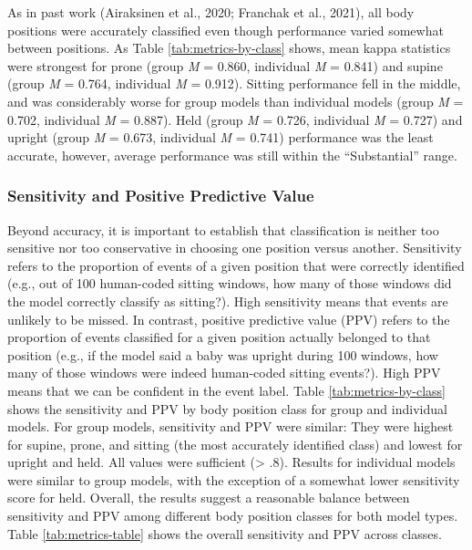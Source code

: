 \documentclass[
  man]{apa6}
\begin{document}
As in past work (Airaksinen et al., 2020; Franchak et al., 2021), all body positions were accurately classified even though performance varied somewhat between positions. As Table \ref{tab:metrics-by-class} shows, mean kappa statistics were strongest for prone (group \emph{M} = 0.860, individual \emph{M} = 0.841) and supine (group \emph{M} = 0.764, individual \emph{M} = 0.912). Sitting performance fell in the middle, and was considerably worse for group models than individual models (group \emph{M} = 0.702, individual \emph{M} = 0.887). Held (group \emph{M} = 0.726, individual \emph{M} = 0.727) and upright (group \emph{M} = 0.673, individual \emph{M} = 0.741) performance was the least accurate, however, average performance was still within the ``Substantial'' range.

\hypertarget{sensitivity-and-positive-predictive-value}{%
\subsubsection{Sensitivity and Positive Predictive Value}\label{sensitivity-and-positive-predictive-value}}

Beyond accuracy, it is important to establish that classification is neither too sensitive nor too conservative in choosing one position versus another. Sensitivity refers to the proportion of events of a given position that were correctly identified (e.g., out of 100 human-coded sitting windows, how many of those windows did the model correctly classify as sitting?). High sensitivity means that events are unlikely to be missed. In contrast, positive predictive value (PPV) refers to the proportion of events classified for a given position actually belonged to that position (e.g., if the model said a baby was upright during 100 windows, how many of those windows were indeed human-coded sitting events?). High PPV means that we can be confident in the event label. Table \ref{tab:metrics-by-class} shows the sensitivity and PPV by body position class for group and individual models. For group models, sensitivity and PPV were similar: They were highest for supine, prone, and sitting (the most accurately identified class) and lowest for upright and held. All values were sufficient (\textgreater{} .8). Results for individual models were similar to group models, with the exception of a somewhat lower sensitivity score for held. Overall, the results suggest a reasonable balance between sensitivity and PPV among different body position classes for both model types. Table \ref{tab:metrics-table} shows the overall sensitivity and PPV across classes.
\end{document}
